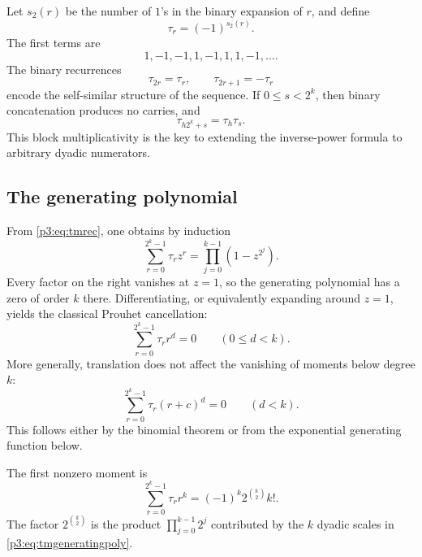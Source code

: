 \documentclass[11pt,oneside]{article}
\theoremstyle{definition}
\theoremstyle{remark}
\newcommand{\tm}{\tau}
\begin{document}
Let $s_2(r)$ be the number of $1$'s in the binary expansion of $r$, and define
\begin{equation}\label{p3:eq:tmdef}
 \tm_r=(-1)^{s_2(r)}.
\end{equation}
The first terms are
\[
 1,-1,-1,1,-1,1,1,-1,\ldots.
\]
The binary recurrences
\begin{equation}\label{p3:eq:tmrec}
 \tm_{2r}=\tm_r,
 \qquad
 \tm_{2r+1}=-\tm_r
\end{equation}
encode the self-similar structure of the sequence.  If $0\le s<2^k$, then binary concatenation produces no carries, and
\begin{equation}\label{p3:eq:tmblockmult}
 \tm_{h2^k+s}=\tm_h\tm_s.
\end{equation}
This block multiplicativity is the key to extending the inverse-power formula to arbitrary dyadic numerators.

\subsection{The generating polynomial}

From \eqref{p3:eq:tmrec}, one obtains by induction
\begin{equation}\label{p3:eq:tmgeneratingpoly}
 \sum_{r=0}^{2^k-1}\tm_r z^r
 =\prod_{j=0}^{k-1}(1-z^{2^j}).
\end{equation}
Every factor on the right vanishes at $z=1$, so the generating polynomial has a zero of order $k$ there.  Differentiating, or equivalently expanding around $z=1$, yields the classical Prouhet cancellation:
\begin{equation}\label{p3:eq:prouhet}
 \sum_{r=0}^{2^k-1}\tm_r r^d=0
 \qquad(0\le d<k).
\end{equation}
More generally, translation does not affect the vanishing of moments below degree $k$:
\begin{equation}\label{p3:eq:prouhettranslate}
 \sum_{r=0}^{2^k-1}\tm_r(r+c)^d=0
 \qquad(d<k).
\end{equation}
This follows either by the binomial theorem or from the exponential generating function below.

The first nonzero moment is
\begin{equation}\label{p3:eq:prouhetfirst}
 \sum_{r=0}^{2^k-1}\tm_r r^k
 =(-1)^k2^{\binom{k}{2}}k!.
\end{equation}
The factor $2^{\binom{k}{2}}$ is the product $\prod_{j=0}^{k-1}2^j$ contributed by the $k$ dyadic scales in \eqref{p3:eq:tmgeneratingpoly}.
\end{document}
